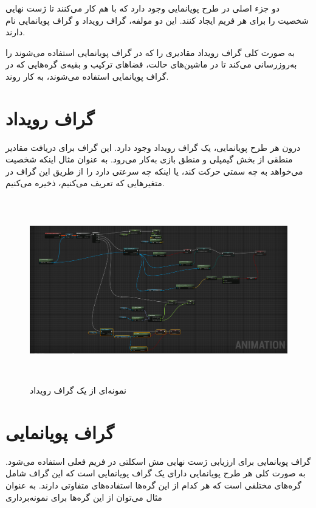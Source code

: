 دو جزء اصلی در طرح پویانمایی وجود دارد که با هم کار می‌کنند تا ژست نهایی شخصیت را برای هر 
فریم ایجاد کنند.
این دو مولفه، گراف رویداد و گراف پویانمایی نام دارند.

به صورت کلی گراف رویداد مقادیری را که در گراف پویانمایی استفاده می‌شوند را به‌روز‌رسانی می‌‌کند تا 
در ماشین‌های حالت، فضاهای ترکیب و بقیه‌ی گره‌هایی که در گراف پویانمایی
 استفاده می‌شوند، به کار روند.

\section{گراف رویداد}

درون هر طرح پویانمایی، یک گراف رویداد وجود دارد. 
این گراف برای دریافت مقادیر منطقی از بخش گیمپلی و منطق بازی به‌کار می‌رود.
به عنوان مثال اینکه شخصیت می‌خواهد به چه سمتی حرکت کند، یا اینکه چه سرعتی دارد را 
از طریق این گراف در متغیرهایی که تعریف می‌کنیم، ذخیره می‌کنیم.
\cite{EventGraphUnrealEngine}

\begin{figure}[ht]
	\centerline{\includegraphics[width=\textwidth,height=8cm,keepaspectratio]{Figures/Ch3/EventGraph.png}}

	\caption{نمونه‌ای از یک گراف رویداد}
	\label{fig:EventGraph}
\end{figure}


\section{گراف پویا‌نمایی}

گراف پویانمایی برای ارزیابی ژست نهایی مش اسکلتی در فریم فعلی استفاده می‌شود.
به صورت کلی هر طرح پویانمایی دارای یک گراف پویانمایی است که 
این گراف شامل گره‌های مختلفی است که هر کدام از این گره‌ها استفاده‌های متفاوتی دارند.
به عنوان مثال می‌توان از این گره‌ها برای نمونه‌برداری



